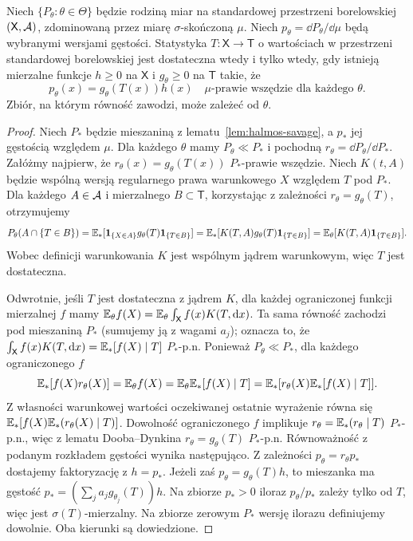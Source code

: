 \begin{twierdzenie}
\label{thm:factorization}
Niech $\{P_\theta:\theta\in\Theta\}$ będzie rodziną miar na
standardowej przestrzeni borelowskiej $(\mathsf X,\mathcal A)$,
zdominowaną przez miarę $\sigma$-skończoną $\mu$.
Niech $p_\theta=\dd P_\theta/\dd\mu$ będą wybranymi wersjami
gęstości. Statystyka $T:\mathsf X\to\mathsf T$ o wartościach
w przestrzeni standardowej borelowskiej jest dostateczna wtedy
i tylko wtedy, gdy istnieją mierzalne funkcje $h\ge0$ na
$\mathsf X$ i $g_\theta\ge0$ na $\mathsf T$ takie, że
\[
p_\theta(x)=g_\theta(T(x))h(x)
\quad\mu\text{-prawie wszędzie dla każdego }\theta.
\]
Zbiór, na którym równość zawodzi, może zależeć od $\theta$.
\end{twierdzenie}
\begin{proof}
Niech $P_*$ będzie mieszaniną z lematu~\ref{lem:halmos-savage},
a $p_*$ jej gęstością względem $\mu$. Dla każdego $\theta$
mamy $P_\theta\ll P_*$ i pochodną
$r_\theta=\dd P_\theta/\dd P_*$. Załóżmy najpierw,
że $r_\theta(x)=g_\theta(T(x))$ $P_*$-prawie wszędzie.
Niech $K(t,A)$ będzie wspólną wersją regularnego prawa warunkowego
$X$ względem $T$ pod $P_*$. Dla każdego $A\in\mathcal A$
i mierzalnego $B\subset\mathsf T$, korzystając z zależności
$r_\theta=g_\theta(T)$, otrzymujemy
\[
P_\theta(A\cap\{T\in B\})
=\mathbb E_*[\mathbf 1_{\{X\in A\}}g_\theta(T)\mathbf 1_{\{T\in B\}}]
=\mathbb E_*[K(T,A)g_\theta(T)\mathbf 1_{\{T\in B\}}]
=\mathbb E_\theta[K(T,A)\mathbf 1_{\{T\in B\}}].
\]
Wobec definicji warunkowania $K$ jest wspólnym jądrem warunkowym,
więc $T$ jest dostateczna.

Odwrotnie, jeśli $T$ jest dostateczna z jądrem $K$, dla każdej
ograniczonej funkcji mierzalnej $f$ mamy
$\mathbb E_\theta f(X)=\mathbb E_\theta\int_{\mathsf X}f(x)K(T,\mathrm d x)$.
Ta sama równość zachodzi pod mieszaniną $P_*$ (sumujemy ją
z wagami $a_j$); oznacza to, że
$\int_{\mathsf X}f(x)K(T,\mathrm d x)=\mathbb E_*[f(X)\mid T]$ $P_*$-p.n.
Ponieważ $P_\theta\ll P_*$, dla każdego ograniczonego $f$
\[
\mathbb E_*[f(X)r_\theta(X)]
=\mathbb E_\theta f(X)
=\mathbb E_\theta\mathbb E_*[f(X)\mid T]
=\mathbb E_*[r_\theta(X)\mathbb E_*[f(X)\mid T]].
\]
Z własności warunkowej wartości oczekiwanej ostatnie wyrażenie
równa się $\mathbb E_*[f(X)\mathbb E_*(r_\theta(X)\mid T)]$.
Dowolność ograniczonego $f$ implikuje
$r_\theta=\mathbb E_*(r_\theta\mid T)$ $P_*$-p.n., więc z lematu
Dooba--Dynkina $r_\theta=g_\theta(T)$ $P_*$-p.n.
Równoważność z podanym rozkładem gęstości wynika następująco.
Z zależności $p_\theta=r_\theta p_*$ dostajemy faktoryzację
z $h=p_*$. Jeżeli zaś
$p_\theta=g_\theta(T)h$, to mieszanka ma gęstość
$p_*=(\sum_j a_jg_{\theta_j}(T))h$.
Na zbiorze $p_*>0$ iloraz $p_\theta/p_*$ zależy tylko od $T$,
więc jest $\sigma(T)$-mierzalny. Na zbiorze zerowym $P_*$
wersję ilorazu definiujemy dowolnie. Oba kierunki są dowiedzione.
\end{proof}

